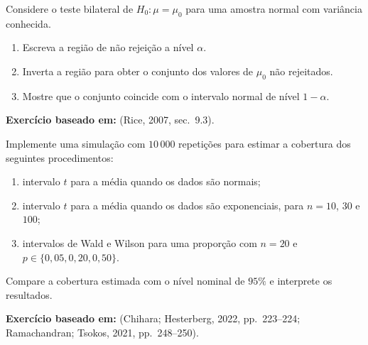 \documentclass[
  letterpaper,
  DIV=11,
  numbers=noendperiod]{scrreprt}
\providecommand{\tightlist}{%
  \setlength{\itemsep}{0pt}\setlength{\parskip}{0pt}}\usepackage{longtable,booktabs,array}
\begin{document}
\begin{tcolorbox}[enhanced jigsaw, colback=white, leftrule=.75mm, colbacktitle=quarto-callout-note-color!10!white, breakable, titlerule=0mm, bottomtitle=1mm, title=\textcolor{quarto-callout-note-color}{\faInfo}\hspace{0.5em}{Exercício 9 --- dualidade}, colframe=quarto-callout-note-color-frame, toprule=.15mm, opacityback=0, bottomrule=.15mm, opacitybacktitle=0.6, arc=.35mm, toptitle=1mm, rightrule=.15mm, coltitle=black, left=2mm]

Considere o teste bilateral de \(H_0:\mu=\mu_0\) para uma amostra normal
com variância conhecida.

\begin{enumerate}
\def\labelenumi{\arabic{enumi}.}
\tightlist
\item
  Escreva a região de não rejeição a nível \(\alpha\).
\item
  Inverta a região para obter o conjunto dos valores de \(\mu_0\) não
  rejeitados.
\item
  Mostre que o conjunto coincide com o intervalo normal de nível
  \(1-\alpha\).
\end{enumerate}

\textbf{Exercício baseado em:} (Rice, 2007, sec.~9.3).

\end{tcolorbox}

\begin{tcolorbox}[enhanced jigsaw, colback=white, leftrule=.75mm, colbacktitle=quarto-callout-note-color!10!white, breakable, titlerule=0mm, bottomtitle=1mm, title=\textcolor{quarto-callout-note-color}{\faInfo}\hspace{0.5em}{Exercício 10 --- cobertura por simulação}, colframe=quarto-callout-note-color-frame, toprule=.15mm, opacityback=0, bottomrule=.15mm, opacitybacktitle=0.6, arc=.35mm, toptitle=1mm, rightrule=.15mm, coltitle=black, left=2mm]

Implemente uma simulação com \(10\,000\) repetições para estimar a
cobertura dos seguintes procedimentos:

\begin{enumerate}
\def\labelenumi{\arabic{enumi}.}
\tightlist
\item
  intervalo \(t\) para a média quando os dados são normais;
\item
  intervalo \(t\) para a média quando os dados são exponenciais, para
  \(n=10\), \(30\) e \(100\);
\item
  intervalos de Wald e Wilson para uma proporção com \(n=20\) e
  \(p\in\{0{,}05,0{,}20,0{,}50\}\).
\end{enumerate}

Compare a cobertura estimada com o nível nominal de \(95\%\) e
interprete os resultados.

\textbf{Exercício baseado em:} (Chihara; Hesterberg, 2022, pp.~223--224;
Ramachandran; Tsokos, 2021, pp.~248--250).

\end{tcolorbox}
\end{document}
